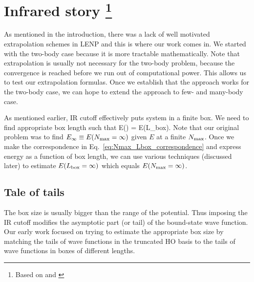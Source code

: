 	\section[Infrared story]{Infrared story
	\footnote{Based on \cite{More:2013rma} and \cite{Furnstahl:2013vda}}}
	\label{sec:IR_story}

	As mentioned in the introduction, there was a lack of well motivated
	extrapolation schemes in LENP and this is where our work comes in.
	We started with the two-body case because it is more tractable
	mathematically.  Note that extrapolation is usually not necessary for the
	two-body problem, because the convergence is reached before we run out of
	computational power.  This allows us to test our extrapolation formulas.
	Once we establish that the approach works for the two-body case, we can hope
	to extend the approach to few- and many-body case.

	As mentioned earlier, IR cutoff effectively puts system in a finite box.
	We need to find appropriate box length such that
	\beq
	E(\Nmax) = E(L_{\rm box})\;.
	\label{eq:Nmax_Lbox_correspondence}
	\eeq
	Note that our original problem was to find $E_{\infty} \equiv E({N_{\mathrm{max}}} = \infty)$
	given $E$ at a finite ${N_{\mathrm{max}}}$.  Once we make the correspondence in
	Eq.~\eqref{eq:Nmax_Lbox_correspondence} and express energy as a function of
	box length, we can use various techniques (discussed later) to estimate
	$E (L_{\rm box} = \infty)$ which equals $E({N_{\mathrm{max}}} = \infty)$.

	\subsection{Tale of tails}
	\label{subsec:tale_of_tails}

	The box size is usually bigger than the range of the potential.  Thus
	imposing the IR cutoff modifies the asymptotic part (or tail) of the
	bound-state wave function.  Our early work focused on trying to estimate the
	appropriate box size by matching the tails of wave functions in the truncated
	HO basis to the tails of wave functions in boxes of different lengths.

